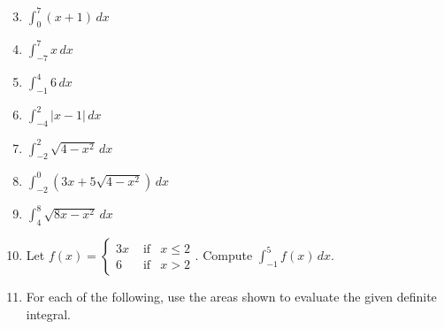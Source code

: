 \documentclass[12pt]{article}
\newif\ifans
\begin{document}

\begin{enumerate}
\setcounter{enumi}{2}

\item $\int_0^7{(x+1)}\,dx$

\ifans{\fbox{$\frac{63}{2}$}} \fi

\item $\int_{-7}^7{x}\,dx$

\ifans{\fbox{$0$}} \fi

\item $\int_{-1}^4{6}\,dx$

\ifans{\fbox{$30$}} \fi

\item $\int_{-4}^{2}{|x-1|} \,dx$

\ifans{\fbox{$13$}} \fi

\item $\int_{-2}^2{\sqrt{4-x^2}} \,dx$

\ifans{\fbox{$2\pi$}} \fi

\item $\int_{-2}^0{\left(3x+5\sqrt{4-x^2}\right)} \,dx$

\ifans{\fbox{$-6+5\pi$}} \fi

\item $\int_4^8{\sqrt{8x-x^2}} \,dx$

\ifans{\fbox{$4\pi$}} \fi

\item Let $f(x)=\left\{\begin{array}{lll}
3x & \text{ if} & x \leq 2 \\
6 & \text{ if} & x>2
\end{array}\right.$.  Compute $\int_{-1}^5{f(x)} \,dx$.

\ifans{\fbox{$\frac{45}{2}$}} \fi

\item For each of the following, use the areas shown to evaluate the given definite integral.

\begin{center}


\end{center}
\end{enumerate}
\end{document}
